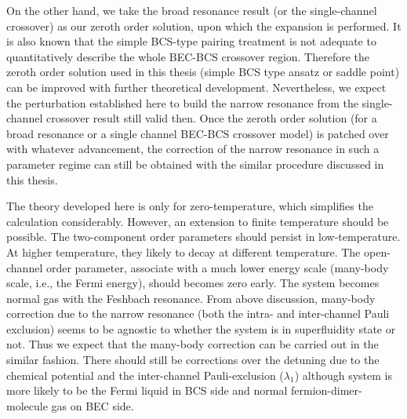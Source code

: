        On the other hand, we take the broad resonance result (or the single-channel crossover) as our zeroth order solution, upon which the expansion is performed.  It is also known that the simple BCS-type pairing treatment is not adequate  to quantitatively describe the whole BEC-BCS crossover region.  Therefore the zeroth order solution used in this thesis (simple BCS type ansatz or saddle point) can be improved with further theoretical development.  Nevertheless, we expect the perturbation established here to build the narrow resonance from the single-channel crossover result still valid then.  Once the zeroth order solution (for a broad resonance or a single channel BEC-BCS crossover model) is patched over with whatever advancement, the correction of the narrow resonance in such a parameter regime can still be obtained with the similar procedure discussed in this thesis.  
       
       
\begin{unsure}
The theory developed here is only for zero-temperature, which simplifies the calculation considerably.  However, an extension to finite temperature should be possible.  The two-component order parameters should persist in low-temperature.  At higher temperature, they likely to decay at different temperature.  The open-channel order parameter, associate with a much lower energy scale (many-body scale, i.e., the Fermi energy), should becomes zero early.  The system becomes normal gas with the Feshbach resonance.  From above discussion, many-body correction due to the narrow resonance (both the intra- and inter-channel Pauli exclusion) seems to be agnostic to whether the system is in superfluidity state or not.  Thus we expect that the many-body correction can be carried out in the similar fashion.   There should still be corrections over the detuning due to the chemical potential and the  inter-channel Pauli-exclusion ($\lambda_{1}$) although system is more likely to be the Fermi liquid in BCS side and normal fermion-dimer-molecule gas on BEC side.   
\end{unsure}
